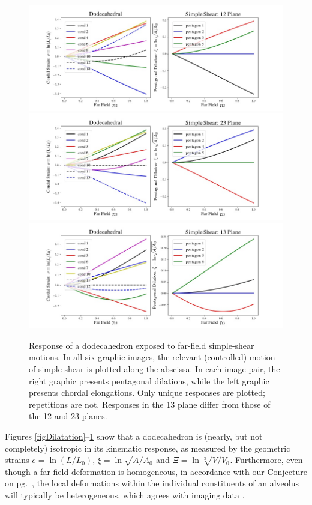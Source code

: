 \begin{figure}
	\centering
	\includegraphics[width=\textwidth]{figures/shear12.jpg} \\
	\includegraphics[width=\textwidth]{figures/shear23.jpg} \\
	\includegraphics[width=\textwidth]{figures/shear13.jpg} 
	\caption{Response of a dodecahedron exposed to far-field simple-shear motions.  In all six graphic images, the relevant (controlled) motion of simple shear is plotted along the abscissa.  In each image pair, the right graphic presents pentagonal dilations, while the left graphic presents chordal elongations. Only unique responses are plotted; repetitions are not. Responses in the 13 plane differ from those of the 12 and 23 planes.}
	\label{figSimpleShears}
\end{figure}

Figures \ref{figDilatation}--\ref{figSimpleShears} show that a dodecahedron is (nearly, but not completely) isotropic in its kinematic response, as measured by the geometric strains $e = \ln (L / L_0)$, $\xi = \ln \sqrt{A / A_0}$ and $\Xi = \ln \sqrt[3]{V / V_0}$.  Furthermore, even though a far-field deformation is homogeneous, in accordance with our Conjecture on pg.~\pageref{conjecture}, the local deformations within the individual constituents of an alveolus will typically be heterogeneous, which agrees with imaging data \cite{PerlmanBhattacharya07}.

